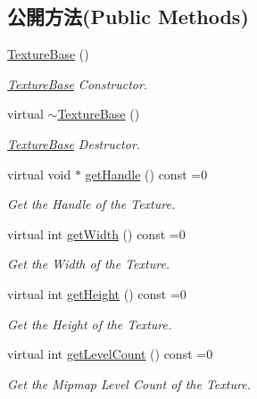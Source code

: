 \subsection*{公開方法(Public Methods)}
\begin{DoxyCompactItemize}
\item 
\hyperlink{class_i_dream_sky_1_1_texture_base_a4122f02aa0446f2f3e33d8593e0af3e7}{Texture\+Base} ()
\begin{DoxyCompactList}\small\item\em \hyperlink{class_i_dream_sky_1_1_texture_base}{Texture\+Base} Constructor. \end{DoxyCompactList}\item 
virtual \hyperlink{class_i_dream_sky_1_1_texture_base_a02e6c749103f29c0ae38a33d15932eac}{$\sim$\+Texture\+Base} ()
\begin{DoxyCompactList}\small\item\em \hyperlink{class_i_dream_sky_1_1_texture_base}{Texture\+Base} Destructor. \end{DoxyCompactList}\item 
virtual void $\ast$ \hyperlink{class_i_dream_sky_1_1_texture_base_adf764e08991237e828a14138062e9aea}{get\+Handle} () const  =0
\begin{DoxyCompactList}\small\item\em Get the Handle of the Texture. \end{DoxyCompactList}\item 
virtual int \hyperlink{class_i_dream_sky_1_1_texture_base_a3369e6e6bcd6f19b8786c462b9a5762d}{get\+Width} () const  =0
\begin{DoxyCompactList}\small\item\em Get the Width of the Texture. \end{DoxyCompactList}\item 
virtual int \hyperlink{class_i_dream_sky_1_1_texture_base_a1fd7eaf666dd5784f6786e51af43fdbc}{get\+Height} () const  =0
\begin{DoxyCompactList}\small\item\em Get the Height of the Texture. \end{DoxyCompactList}\item 
virtual int \hyperlink{class_i_dream_sky_1_1_texture_base_a70adf4a89afa89b36375cded9281d66b}{get\+Level\+Count} () const  =0
\begin{DoxyCompactList}\small\item\em Get the Mipmap Level Count of the Texture. \end{DoxyCompactList}\item 

\end{DoxyCompactItemize}
